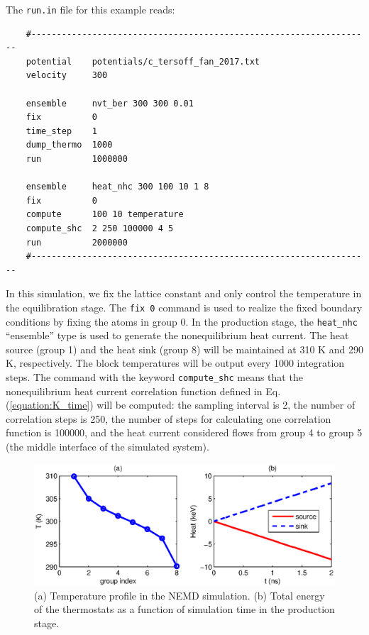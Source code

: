 \documentclass[12pt,a4paper]{report}
\begin{document}
The \verb"run.in" file for this example reads:
\begin{verbatim}
    #-------------------------------------------------------------------
    potential    potentials/c_tersoff_fan_2017.txt
    velocity     300

    ensemble     nvt_ber 300 300 0.01
    fix          0
    time_step    1
    dump_thermo  1000
    run          1000000

    ensemble     heat_nhc 300 100 10 1 8
    fix          0
    compute      100 10 temperature
    compute_shc  2 250 100000 4 5
    run          2000000
    #-------------------------------------------------------------------
\end{verbatim}

In this simulation, we fix the lattice constant and only control the temperature in the equilibration stage. The \verb"fix 0" command is used to realize the fixed boundary conditions by fixing the atoms in group 0. In the production stage, the \verb"heat_nhc" ``ensemble'' type is used to generate the nonequilibrium heat current.  The heat source (group 1) and the heat sink (group 8) will be maintained at 310 K and 290 K, respectively. The block temperatures will be output every 1000 integration steps. The command with the keyword \verb"compute_shc" means that the nonequilibrium heat current correlation function defined in Eq. (\ref{equation:K_time}) will be computed: the sampling interval is 2, the number of correlation steps is 250, the number of steps for calculating one correlation function is 100000, and the heat current considered flows from group 4 to group 5 (the middle interface of the simulated system).


\begin{figure}[ht]
\begin{center}
\includegraphics[width=\columnwidth]{ex4a.eps}
\caption{(a) Temperature profile in the NEMD simulation. (b) Total energy of the thermostats as a function of simulation time in the production stage. }
\label{figure:ex4a}
\end{center}
\end{figure}
\end{document}
